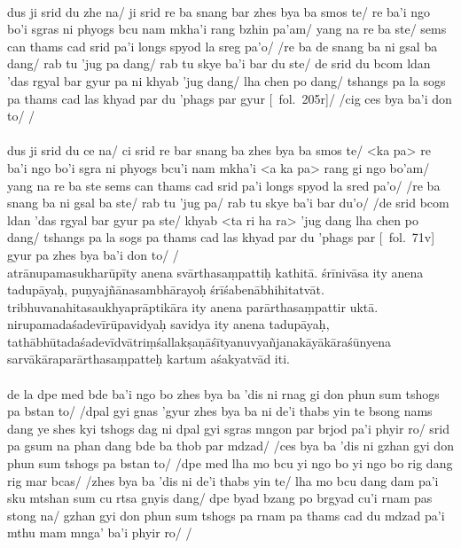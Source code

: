 \documentclass[12pt]{article}
\begin{document}
\textbf{\TVA}\\
dus ji srid du zhe na/ ji srid re ba snang bar zhes bya ba smos te/ re ba'i ngo bo'i sgras ni phyogs bcu nam mkha'i rang bzhin pa'am/ yang na re ba ste/ sems can thams cad srid pa'i longs spyod la sreg pa'o/ /re ba de snang ba ni gsal ba dang/ rab tu 'jug pa dang/ rab tu skye ba'i bar du ste/ de srid du bcom ldan 'das rgyal bar gyur pa ni khyab 'jug dang/ lha chen po dang/ tshangs pa la sogs pa thams cad las khyad par du 'phags par gyur [\TVA\ fol.\ 205r]/ /cig ces bya ba'i don to/ /\\

\textbf{\TVB}\\
dus ji srid du ce na/ ci srid re bar snang ba zhes bya ba smos te/ <ka pa> re ba'i ngo bo'i sgra ni phyogs bcu'i nam mkha'i <a ka pa> rang gi ngo bo'am/ yang na re ba ste sems can thams cad srid pa'i longs spyod la sred pa'o/ /re ba snang ba ni gsal ba ste/ rab tu 'jug pa/ rab tu skye ba'i bar du'o/ /de srid bcom ldan 'das rgyal bar gyur pa ste/ khyab <ta ri ha ra> 'jug dang lha chen po dang/ tshangs pa la sogs pa thams cad las khyad par du 'phags par [\TVB\ fol.\ 71v] gyur pa zhes bya ba'i don to/ /\\

atrānupamasukharūpīty anena svārthasaṃpattiḥ kathitā.
śrīnivāsa ity anena tadupāyaḥ, puṇyajñānasambhārayoḥ śrīśabenābhihitatvāt.
tribhuvanahitasaukhyaprāptikāra ity anena parārthasaṃpattir uktā.
nirupamadaśadevīrūpavidyaḥ savidya ity anena tadupāyaḥ, tathābhūta\footnoteB{
	tathābhūta°] \MS\ \EDD ; \emph{no reflect in } \TIB
}daśadevīdvātriṃśallakṣaṇāśītyanuvyañjanakāyākāraśūnyena\footnoteB{
	°kāyā°] \MS\ \EDD ; dam pa'i sku \TIB\ (satkāya)
} sarvākāraparārthasaṃpatteḥ kartum aśakyatvād iti.\\

\textbf{\TVA}\\
de la dpe med bde ba'i ngo bo zhes bya ba 'dis ni rnag gi don phun sum tshogs pa bstan to/ /dpal gyi gnas 'gyur zhes bya ba ni de'i thabs yin te bsong nams dang ye shes kyi tshogs dag ni dpal gyi sgras mngon par brjod pa'i phyir ro/ srid pa gsum na phan dang bde ba thob par mdzad/ /ces bya ba 'dis ni gzhan gyi don phun sum tshogs pa bstan to/ /dpe med lha mo bcu yi ngo bo yi ngo bo rig dang rig mar bcas/ /zhes bya ba 'dis ni de'i thabs yin te/ lha mo bcu dang dam pa'i sku mtshan sum cu rtsa gnyis dang/ dpe byad bzang po brgyad cu'i rnam pas stong na/ gzhan gyi don phun sum tshogs pa rnam pa thams cad du mdzad pa'i mthu mam mnga' ba'i phyir ro/ /\\
\end{document}
